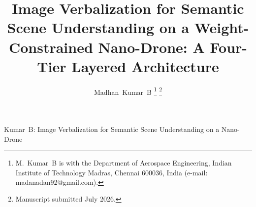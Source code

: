 \documentclass[journal]{IEEEtran}
\begin{document}
\title{Image Verbalization for Semantic Scene Understanding on a
       Weight-Constrained Nano-Drone: A Four-Tier Layered Architecture}

\author{Madhan~Kumar~B%
\thanks{M.~Kumar~B is with the Department of Aerospace Engineering,
        Indian Institute of Technology Madras, Chennai 600036, India
        (e-mail: madanadan92@gmail.com).}%
\thanks{Manuscript submitted July 2026.}}

%
         {Kumar~B: Image Verbalization for Semantic Scene Understanding on a Nano-Drone}

\maketitle

\end{document}
